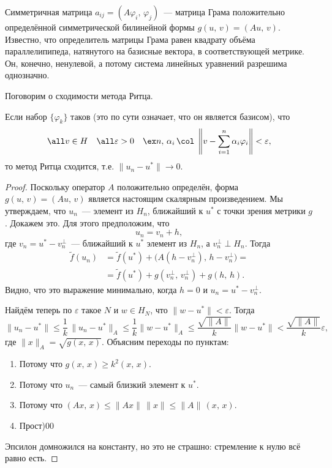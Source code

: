 \documentclass{trlnotes}
\begin{document}
    \begin{rem}
        Симметричная матрица $a_{ij} = (A\varphi_i, \, \varphi_j)$~--- матрица Грама положительно определённой симметрической билинейной формы $g(u, \, v) = (Au, \, v)$. Известно, что определитель матрицы Грама равен квадрату объёма параллелипипеда, натянутого на базисные вектора, в соответствующей метрике. Он, конечно, ненулевой, а потому система линейных уравнений разрешима однозначно.
    \end{rem}

    Поговорим о сходимости метода Ритца.

    \begin{st}
        Если набор $\{\varphi_k\}$ таков (это по сути означает, что он является базисом), что
        \[
            \all v \in H \quad \all \varepsilon > 0 \quad \ex n, \, \alpha_i \, \col \; \left\|v - \sum\limits_{i = 1}^n \alpha_i \varphi_i \right\| < \varepsilon,
        \]
        то метод Ритца сходится, т.е. $\|u_n - u^*\| \to 0$.
        \begin{proof}
            Поскольку оператор $A$ положительно определён, форма $g(u, \, v) = (Au, \, v)$ является настоящим скалярным произведением. Мы утверждаем, что $u_n$~--- элемент из $H_n$, ближайший к $u^*$ с точки зрения метрики $g$. Докажем это. Для этого предположим, что
            \[
                u_n = v_n + h,
            \]
            где $v_n = u^* - v_n^{\perp}$~--- ближайший к $u^*$ элемент из $H_n$, а $v_n^{\perp} \perp H_n$. Тогда
            \begin{align*}
                \tilde{f}(u_n) &= \tilde{f}(u^*) + \big(A(h - v_n^\perp), \, h - v_n^\perp\big) = \\ &= \tilde{f}(u^*) + g(v_n^{\perp}, \, v_n^{\perp}) + g(h, \, h).
            \end{align*}
            Видно, что это выражение минимально, когда $h = 0$ и $u_n = u^* - v_n^{\perp}$.

            Найдём теперь по $\varepsilon$ такое $N$ и $w \in H_N$, что $\|w - u^*\| < \varepsilon$. Тогда
            \[
                \|u_n - u^*\| \leqslant \dfrac{1}{k} \, \|u_n - u^*\|_A \leqslant \dfrac{1}{k} \|w - u^*\|_A \leqslant \dfrac{\sqrt{\|A\|}}{k} \|w - u^*\| < \dfrac{\sqrt{\|A\|}}{k} \varepsilon,
            \]
            где $\|x\|_A = \sqrt{g(x, \, x)}$. Объясним переходы по пунктам:
            \begin{enumerate}
                \item Потому что $g(x, \, x) \geqslant k^2 (x, \, x)$.
                \item Потому что $u_n$~--- самый близкий элемент к $u^*$.
                \item Потому что $(Ax, \, x) \leqslant \|Ax\| \, \|x\| \leqslant \|A\| \, (x, \, x)$.
                \item Прост)00
            \end{enumerate}
            Эпсилон домножился на константу, но это не страшно: стремление к нулю всё равно есть.
        \end{proof}
    \end{st}
\end{document}

